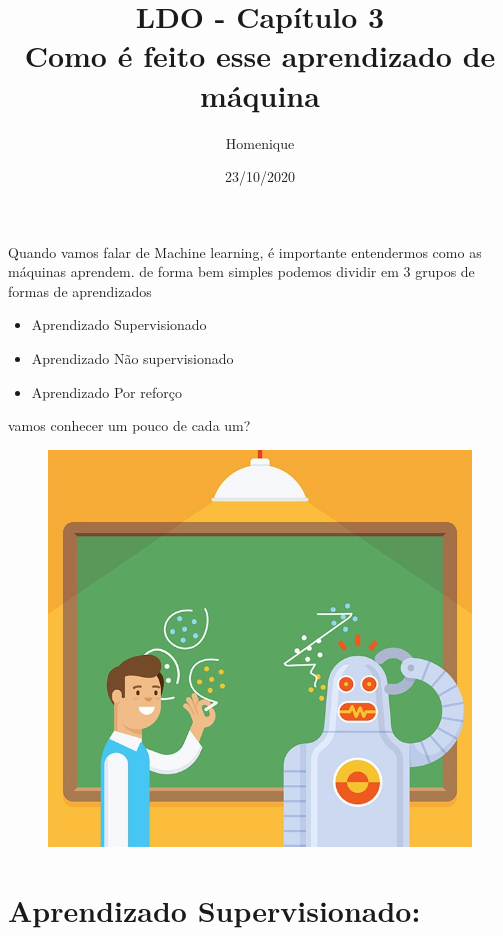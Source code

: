 \documentclass[12pt]{article}
\title{\textbf{LDO - Capítulo 3\\
Como é feito esse aprendizado de máquina}}
\author{Homenique}
\date{23/10/2020}
\begin{document}
    \maketitle

        Quando vamos falar de Machine learning, é importante entendermos como as máquinas aprendem. de forma bem simples podemos dividir em 3 grupos de formas de aprendizados 
        \begin{itemize}
            \item Aprendizado Supervisionado
            \item Aprendizado Não supervisionado
            \item Aprendizado Por reforço
          \end{itemize}
          vamos conhecer um pouco de cada um?
    
            \begin{figure}[ht]
                \centering
                \includegraphics[scale=0.5]{robo_aprendedo.jpg}               
            \end{figure}
            
            \clearpage
            
            \section{Aprendizado Supervisionado:}
\end{document}

